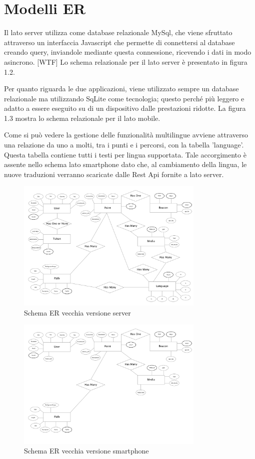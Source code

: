 \section{Modelli ER}\vspace{5mm}
		
	Il lato server utilizza come database relazionale MySql, che viene sfruttato attraverso un interfaccia Javascript che permette di connettersi al database creando query, inviandole mediante questa connessione, ricevendo i dati in modo asincrono. [WTF] Lo schema relazionale per il lato server è presentato in figura 1.2.\vspace{5mm}
	
	Per quanto riguarda le due applicazioni, viene utilizzato sempre un database relazionale ma utilizzando SqLite come tecnologia; questo perché più leggero e adatto a essere eseguito su di un dispositivo dalle prestazioni ridotte. La figura 1.3 mostra lo schema relazionale per il lato mobile.\vspace{5mm}

Come si può vedere la gestione delle funzionalità multilingue avviene attraverso una relazione da uno a molti, tra i punti e i percorsi, con la tabella 'language'. Questa tabella contiene tutti i testi per lingua supportata. Tale accorgimento è assente nello schema lato smartphone dato che, al cambiamento della lingua, le nuove traduzioni verranno scaricate dalle Rest Api fornite a lato server.

\begin{figure}[h]
\centering
\includegraphics[width=0.8\textwidth]{images/erOld.png}
\caption{Schema ER vecchia versione server}
\end{figure}

\begin{figure}[h]
\centering
\includegraphics[width=0.8\textwidth]{images/erOldSpartphone.png}
\caption{Schema ER vecchia versione smartphone}
\end{figure}
\vspace{5mm}






